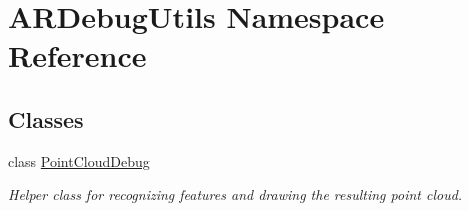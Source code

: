 \hypertarget{namespace_a_r_debug_utils}{}\section{A\+R\+Debug\+Utils Namespace Reference}
\label{namespace_a_r_debug_utils}
\subsection*{Classes}
\begin{DoxyCompactItemize}
\item 
class \hyperlink{class_a_r_debug_utils_1_1_point_cloud_debug}{Point\+Cloud\+Debug}
\begin{DoxyCompactList}\small\item\em Helper class for recognizing features and drawing the resulting point cloud. \end{DoxyCompactList}\end{DoxyCompactItemize}
